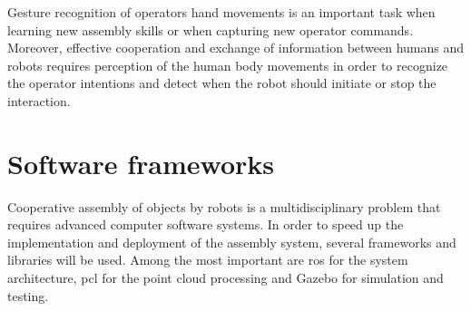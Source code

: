 Gesture recognition of operators hand movements \cite{Oikonomidis2012,Gleeson2013} is an important task when learning new assembly skills or when capturing new operator commands. Moreover, effective cooperation and exchange of information between humans and robots requires perception of the human body movements \cite{Roitberg2014} in order to recognize the operator intentions and detect when the robot should initiate or stop the interaction.


%



\section{Software frameworks}

Cooperative assembly of objects by robots is a multidisciplinary problem that requires advanced computer software systems. In order to speed up the implementation and deployment of the assembly system, several frameworks and libraries will be used. Among the most important are \gls{ros} for the system architecture, \gls{pcl} for the point cloud processing and Gazebo for simulation and testing.


